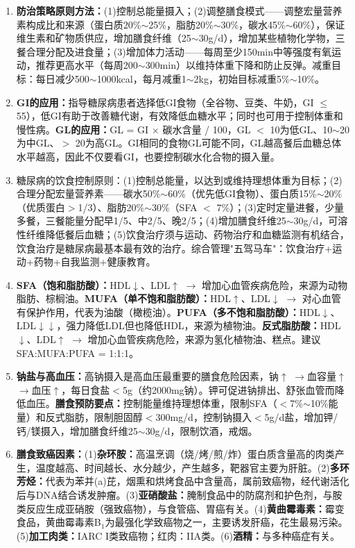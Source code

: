 {\begin{enumerate}[leftmargin=*, itemsep=5pt]
    \item \textbf{防治策略原则方法：}(1)控制总能量摄入；(2)调整膳食模式——调整宏量营养素构成比和来源（蛋白质20\%$\sim$25\%，脂肪20\%$\sim$30\%，碳水45\%$\sim$60\%），保证维生素和矿物质供应，增加膳食纤维（25$\sim$30g/d），增加某些植物化学物，三餐合理分配及进食量；(3)增加体力活动——每周至少150min中等强度有氧运动，推荐更高水平（每周200$\sim$300min）以维持体重下降和防止反弹。减重目标：每日减少500$\sim$1000kcal，每月减重1$\sim$2kg，初始目标减重5\%$\sim$10\%。

    \item \textbf{GI的应用：}指导糖尿病患者选择低GI食物（全谷物、豆类、牛奶，GI $\leq$ 55），低GI有助于改善糖代谢，有效降低血糖水平；同时也可用于控制体重和慢性病。\textbf{GL的应用：}GL = GI $\times$ 碳水含量 / 100，GL $<$ 10为低GL、10$\sim$20为中GL、$>$ 20为高GL。GI相同的食物GL可能不同，GL越高餐后血糖总体水平越高，因此不仅要看GI，也要控制碳水化合物的摄入量。

    \item 糖尿病的饮食控制原则：(1)控制总能量，以达到或维持理想体重为目标；(2)合理分配宏量营养素——碳水50\%$\sim$60\%（优先低GI食物）、蛋白质15\%$\sim$20\%（优质蛋白$>$1/3）、脂肪20\%$\sim$30\%（SFA $<$ 7\%）；(3)定时定量进餐，少量多餐，三餐能量分配早1/5、中2/5、晚2/5；(4)增加膳食纤维25$\sim$30g/d，可溶性纤维降低餐后血糖；(5)饮食治疗须与运动、药物治疗和血糖监测有机结合，饮食治疗是糖尿病最基本最有效的治疗。综合管理"五驾马车"：饮食治疗+运动+药物+自我监测+健康教育。

    \item \textbf{SFA（饱和脂肪酸）：}HDL$\downarrow$、LDL$\uparrow$ $\rightarrow$ 增加心血管疾病危险，来源为动物脂肪、棕榈油。\textbf{MUFA（单不饱和脂肪酸）：}HDL$\uparrow$、LDL$\downarrow$ $\rightarrow$ 对心血管有保护作用，代表为油酸（橄榄油）。\textbf{PUFA（多不饱和脂肪酸）：}HDL$\downarrow$、LDL$\downarrow\downarrow$，强力降低LDL但也降低HDL，来源为植物油。\textbf{反式脂肪酸：}HDL$\downarrow$、LDL$\uparrow$ $\rightarrow$ 增加心血管疾病危险，来源为氢化植物油、糕点。建议SFA:MUFA:PUFA = 1:1:1。

    \item \textbf{钠盐与高血压：}高钠摄入是高血压最重要的膳食危险因素，钠$\uparrow$ $\rightarrow$血容量$\uparrow$ $\rightarrow$血压$\uparrow$，每日食盐$<$5g（约2000mg钠）。钾可促进钠排出、舒张血管而降低血压。\textbf{膳食预防要点：}控制能量维持理想体重，限制SFA（$<$7\%$\sim$10\%能量）和反式脂肪，限制胆固醇$<$300mg/d，控制钠摄入$<$5g/d盐，增加钾/钙/镁摄入，增加膳食纤维25$\sim$30g/d，限制饮酒，戒烟。

    \item \textbf{膳食致癌因素：}(1)\textbf{杂环胺：}高温烹调（烧/烤/煎/炸）蛋白质含量高的肉类产生，温度越高、时间越长、水分越少，产生越多，靶器官主要为肝脏。(2)\textbf{多环芳烃：}代表为苯并(a)芘，烟熏和烘烤食品中含量高，属前致癌物，经代谢活化后与DNA结合诱发肿瘤。(3)\textbf{亚硝酸盐：}腌制食品中的防腐剂和护色剂，与胺类反应生成亚硝胺（强致癌物），与食管癌、胃癌有关。(4)\textbf{黄曲霉毒素：}霉变食品，黄曲霉毒素B$_1$为最强化学致癌物之一，主要诱发肝癌，花生最易污染。(5)\textbf{加工肉类：}IARC I类致癌物；红肉：IIA类。(6)\textbf{酒精：}与多种癌症有关。


\end{enumerate}}
